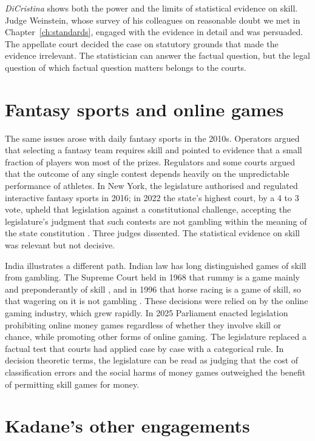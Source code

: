 \emph{DiCristina} shows both the power and the limits of statistical evidence on skill. Judge Weinstein, whose survey of his colleagues on reasonable doubt we met in Chapter~\ref{ch:standards}, engaged with the evidence in detail and was persuaded. The appellate court decided the case on statutory grounds that made the evidence irrelevant. The statistician can answer the factual question, but the legal question of which factual question matters belongs to the courts.

\section{Fantasy sports and online games}

The same issues arose with daily fantasy sports in the 2010s. Operators argued that selecting a fantasy team requires skill and pointed to evidence that a small fraction of players won most of the prizes. Regulators and some courts argued that the outcome of any single contest depends heavily on the unpredictable performance of athletes. In New York, the legislature authorised and regulated interactive fantasy sports in 2016; in 2022 the state's highest court, by a 4 to 3 vote, upheld that legislation against a constitutional challenge, accepting the legislature's judgment that such contests are not gambling within the meaning of the state constitution \citep{white2022}. Three judges dissented. The statistical evidence on skill was relevant but not decisive.

India illustrates a different path. Indian law has long distinguished games of skill from gambling. The Supreme Court held in 1968 that rummy is a game mainly and preponderantly of skill \citep{satyanarayana1968}, and in 1996 that horse racing is a game of skill, so that wagering on it is not gambling \citep{lakshmanan1996}. These decisions were relied on by the online gaming industry, which grew rapidly. In 2025 Parliament enacted legislation prohibiting online money games regardless of whether they involve skill or chance, while promoting other forms of online gaming. The legislature replaced a factual test that courts had applied case by case with a categorical rule. In decision theoretic terms, the legislature can be read as judging that the cost of classification errors and the social harms of money games outweighed the benefit of permitting skill games for money.

\section{Kadane's other engagements}

